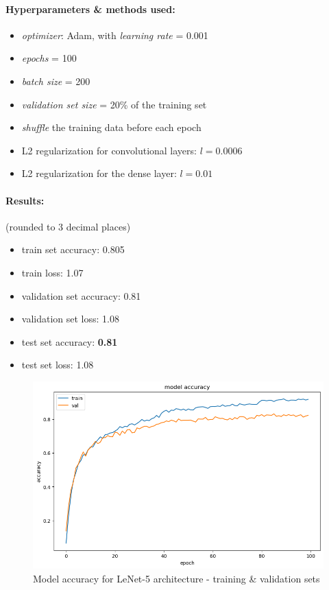\documentclass[12pt]{article}
\begin{document}
        \paragraph{Hyperparameters \& methods used:}
        \begin{itemize}
          \item \textit{optimizer}: Adam, with \textit{learning rate} = 0.001
          \item \textit{epochs} = 100
          \item \textit{batch size} = 200
          \item \textit{validation set size} = 20\% of the training set
          \item \textit{shuffle} the training data before each epoch
          \item L2 regularization for convolutional layers: $l = 0.0006$
          \item L2 regularization for the dense layer: $l = 0.01$
        \end{itemize}
        \paragraph{Results:} (rounded to 3 decimal places)
          \begin{itemize}
            \item train set accuracy: 0.805
            \item train loss: 1.07
            \item validation set accuracy: 0.81
            \item validation set loss: 1.08
            \item test set accuracy: \textbf{0.81}
            \item test set loss: 1.08
          \end{itemize}
              \begin{figure}[H]
                \includegraphics[width=\linewidth]{images/lenet.png}
                \caption{Model accuracy for LeNet-5 architecture - training \& validation sets}
                \label{fig:lenet}
              \end{figure}
\end{document}
